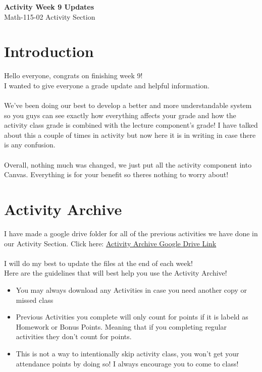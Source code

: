 \documentclass{article}
\begin{document}
\begin{center}
    \Large \textbf{Activity Week 9 Updates} \\
    \vspace{0.2cm}
    \normalsize Math-115-02 Activity Section\\
\end{center}
\section*{Introduction}
Hello everyone, congrats on finishing week 9! \\
I wanted to give everyone a grade update and helpful information.\\
\\
We’ve been doing our best to develop a better and more understandable 
system so you guys can see exactly how everything affects your grade 
and how the activity class grade is combined with the lecture 
component’s grade! I have talked about this a couple of times in 
activity but now here it is in writing in case there is any confusion. 
\\\\
Overall, nothing much was changed, 
we just put all the activity component into Canvas.
Everything is for your benefit so theres nothing to worry about!

\vspace{2cm}

\section*{Activity Archive}
I have made a google drive folder for all of the previous
activities we have done in our Activity Section.
Click here: \href{https://drive.google.com/drive/folders/11neyVp46yyczAnvj1C01ul_MVQoPGQLG?usp=sharing}
{Activity Archive Google Drive Link} \\\\
I will do my best to update the files at the end of each week!
\\
Here are the guidelines that will best help you use 
the Activity Archive!

\begin{itemize}
    \item You may always download any Activities
        in case you need another copy or missed class

    \item Previous Activities you complete will only count
        for points if it is labeld as Homework or Bonus Points. 
        Meaning that if you completing regular \\ 
        activities they don't count for points.

    \item This is not a way to intentionally skip activity
        class, you won't get your attendance points by doing so!
        I always encourage you to come to class!
\end{itemize}
\end{document}

